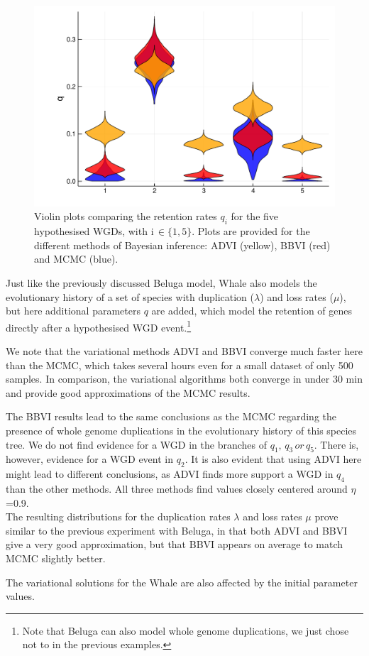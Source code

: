 \begin{figure}
	\centering
	\includegraphics[width=5.2in]{images/whale/whale-q.pdf}
	\caption[Whale experiment retention rates $q$.]{Violin plots comparing the retention rates $q_i$ for the five hypothesised WGDs, with i$\, \in \{1, 5\}$. Plots are provided for the different methods of Bayesian inference: ADVI (yellow), BBVI (red) and MCMC (blue).}
    \label{fig:whale-q}
\end{figure}
\medskip
Just like the previously discussed Beluga model, Whale also models the evolutionary history of a set of species with duplication ($\lambda$) and loss rates ($\mu$), but here additional parameters $q$ are added, which model the retention of genes directly after a hypothesised WGD event.\footnote{Note that Beluga can also model whole genome duplications, we just chose not to in the previous examples.}
\medskip
\par We note that the variational methods ADVI and BBVI converge much faster here than the MCMC, which takes several hours even for a small dataset of only 500 samples. In comparison, the variational algorithms both converge in under 30 min and provide good approximations of the MCMC results.
\medskip
\par The BBVI results lead to the same conclusions as the MCMC regarding the presence of whole genome duplications in the evolutionary history of this species tree. We do not find evidence for a WGD in the branches of $q_1, \, q_3  \, or \, q_5$. There is, however, evidence for a WGD event in $q_2$. It is also evident that using ADVI here might lead to different conclusions, as ADVI finds more support a WGD in $q_4$ than the other methods.
All three methods find values closely centered around $\eta$=0.9.
\\
The resulting distributions for the duplication rates $\lambda$ and loss rates $\mu$ prove similar to the previous experiment with Beluga, in that both ADVI and BBVI give a very good approximation, but that BBVI appears on average to match MCMC slightly better.
\medskip
\par The variational solutions for the Whale are also affected by the initial parameter values.

